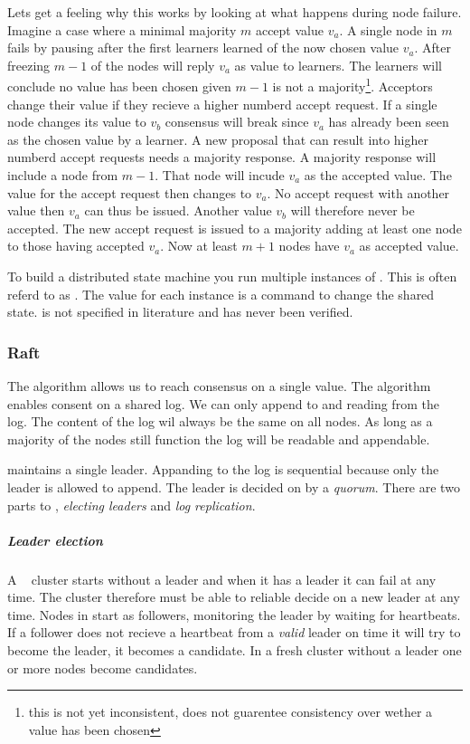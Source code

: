 Lets get a feeling why this works by looking at what happens during node failure. Imagine a case where a minimal majority $m$ accept value $v_a$. A single node in $m$ fails by pausing after the first learners learned of the now chosen value $v_a$. After freezing $m-1$ of the nodes will reply $v_a$ as value to learners. The learners will conclude no value has been chosen given $m-1$ is not a majority\footnote{this is not yet inconsistent, \paxos{} does not guarentee consistency over wether a value has been chosen}. Acceptors change their value if they recieve a higher numberd accept request. If a single node changes its value to $v_b$ consensus will break since $v_a$ has already been seen as the chosen value by a learner. A new proposal that can result into higher numberd accept requests needs a majority response. A majority response will include a node from $m-1$. That node will incude $v_a$ as the accepted value. The value for the accept request then changes to $v_a$. No accept request with another value then $v_a$ can thus be issued. Another value $v_b$ will therefore never be accepted. The new accept request is issued to a majority adding at least one node to those having accepted $v_a$. Now at least $m+1$ nodes have $v_a$ as accepted value.

To build a distributed state machine you run multiple instances of \paxos{}. This is often referd to as \multipaxos{}. The value for each instance is a command to change the shared state. \multipaxos{} is not specified in literature and has never been verified.

\subsubsection*{Raft}
The \paxos{} algorithm allows us to reach consensus on a single value. The \raft{} algorithm enables consent on a shared log. We can only append to and reading from the log. The content of the log wil always be the same on all nodes. As long as a majority of the nodes still function the log will be readable and appendable.

\raft{} maintains a single leader. Appanding to the log is sequential because only the leader is allowed to append. The leader is decided on by a \textit{quorum}. There are two parts to \raft{}, \textit{electing leaders} and \textit{log replication}.

\subparagraph{Leader election} \label{sec:valid}
A \raft{}~\cite{raft} cluster starts without a leader and when it has a leader it can fail at any time. The cluster therefore must be able to reliable decide on a new leader at any time. Nodes in \raft{} start as followers, monitoring the leader by waiting for heartbeats. If a follower does not recieve a heartbeat from a \emph{valid} leader on time it will try to become the leader, it becomes a candidate. In a fresh cluster without a leader one or more nodes become candidates.

